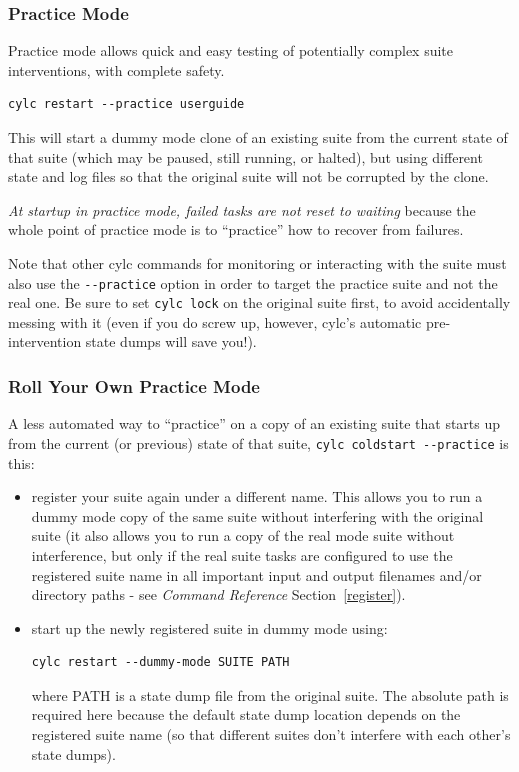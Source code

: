 \documentclass[11pt,a4paper]{article}
\begin{document}
\subsubsection{Practice Mode}

Practice mode allows quick and easy testing of potentially complex
suite interventions, with complete safety.

\begin{lstlisting}
cylc restart --practice userguide
\end{lstlisting}

This will start a dummy mode clone of an existing suite from the
current state of that suite (which may be paused, still running, or
halted), but using different state and log files so that the original
suite will not be corrupted by the clone.

{\em At startup in practice mode, failed tasks are not reset to waiting}
because the whole point of practice mode is to ``practice'' how to
recover from failures.

Note that other cylc commands for monitoring or interacting with the
suite must also use the \lstinline=--practice= option in order to
target the practice suite and not the real one. Be sure to set
\lstinline=cylc lock= on the original suite first, to avoid
accidentally messing with it (even if you do screw up, however, cylc's
automatic pre-intervention state dumps will save you!).


\subsubsection{Roll Your Own Practice Mode}

A less automated way to ``practice'' on a copy of an existing suite
that starts up from the current (or previous) state of that suite, 
\lstinline=cylc coldstart --practice= is this:

\begin{itemize}
    \item register your suite again under a different name. This allows
        you to run a dummy mode copy of the same suite without
        interfering with the original suite (it also allows you to run
        a copy of the real mode suite without interference, but only if
        the real suite tasks are configured to use the registered
        suite name in all important input and output filenames and/or
        directory paths - see {\em Command Reference} Section~\ref{register}).

    \item start up the newly registered suite in dummy mode using:
        \begin{lstlisting}
cylc restart --dummy-mode SUITE PATH
        \end{lstlisting}
        where PATH is a state dump file from the original suite. The
        absolute path is required here because the default state
        dump location depends on the registered suite name (so that
        different suites don't interfere with each other's state
        dumps).

\end{itemize}
\end{document}
